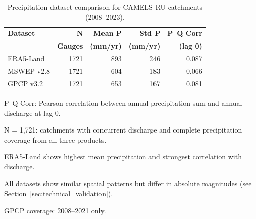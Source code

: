 \begin{table}[htbp]
\centering
\caption{Precipitation dataset comparison for CAMELS-RU catchments (2008--2023).}
\label{tab:precipitation_comparison}
\begin{tabular}{lrrrr}
\toprule
\textbf{Dataset} & \textbf{N} & \textbf{Mean P} & \textbf{Std P} & \textbf{P--Q Corr} \\
 & \textbf{Gauges} & \textbf{(mm/yr)} & \textbf{(mm/yr)} & \textbf{(lag 0)} \\
\midrule
ERA5-Land & 1721 & 893 & 246 & 0.087 \\
MSWEP v2.8 & 1721 & 604 & 183 & 0.066 \\
GPCP v3.2 & 1721 & 653 & 167 & 0.081 \\
\bottomrule
\end{tabular}
\begin{tablenotes}
\small
\item P--Q Corr: Pearson correlation between annual precipitation sum and annual discharge at lag 0.
\item N = 1{,}721: catchments with concurrent discharge and complete precipitation coverage from all three products.
\item ERA5-Land shows highest mean precipitation and strongest correlation with discharge.
\item All datasets show similar spatial patterns but differ in absolute magnitudes (see Section~\ref{sec:technical_validation}).
\item GPCP coverage: 2008--2021 only.
\end{tablenotes}
\end{table}
